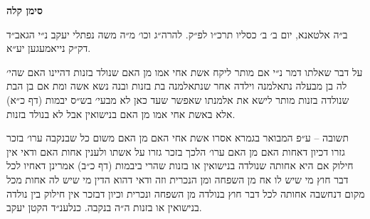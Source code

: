 \documentclass[12pt, openany]{book}
\newcommand{\chapname}{}
\newcommand{\newchap}[1]{
	\addcontentsline{toc}{chapter}{#1}
	\renewcommand{\chapname}{#1}
		\begin{center}
			\textbf{%
\fontsize{16pt}{16pt}\selectfont
				#1}
		\end{center}
}
\begin{document}
\newchap{סימן קלה}
\begin{multicols}{2}
ב״ה אלטאנא, יום ב׳ ב׳ כסליו תרכ״ו לפ״ק. להרה״ג וכו׳ מ״ה משה נפתלי יעקב נ״י הגאב״ד דק״ק נייאמעגען יע״א.\\\vspace{0pt}

על דבר שאלתו דמר נ״י אם מותר ליקח אשת אחי אמו מן האם שנולד בזנות דהיינו האם שהי׳ לה בן מבעלה נתאלמנה וילדה אחר שנתאלמנה בת בזנות ובנה נשא אשה ומת אם בן הבת שנולדה בזנות מותר לישא את אלמנתו שאפשר שעד כאן לא מבעי׳ בש״ס יבמות (דף כ״א) אלא באשת אחי אמו מן האם בנישואין אבל לא בנולד בזנות.\\\vspace{0pt}

תשובה – ע״פ המבואר בגמרא אסרו אשת אחי האם מן האם משום כל שבנקבה ערו׳ בזכר גזרו דכיון דאחות האם מן האם ערו׳ הלכך בזכר גזרו על אשתו ולענין אחות האם ודאי אין חילוק אם היא אחותה שנולדה בנישואין או בזנות שהרי ביבמות (דף כ״ב) אמרינן דאחיו לכל דבר חוץ מי שיש לו אח מן השפחה ומן הנכרית וזה ודאי דהוא הדין מי שיש לה אחות מכל מקום דנחשבה אחותה לכל דבר חוץ בנולדה מן השפחה ונכרית וכיון דבזכר אין חילוק בין נולדה בנישואין או בזנות ה״ה בנקבה. כנלענ״ד הקטן יעקב.\\\vspace{0pt}

\end{multicols}\newpage
\end{document}
